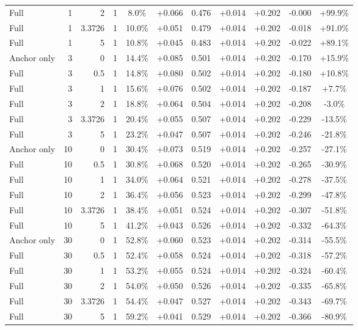 \begin{table}[htbp]
\begin{tabular}{lrrrccccccc}
Full & 1 & 2 & 1 & 8.0\% & +0.066 & 0.476 & +0.014 & +0.202 & -0.000 & +99.9\% \\
Full & 1 & 3.3726 & 1 & 10.0\% & +0.051 & 0.479 & +0.014 & +0.202 & -0.018 & +91.0\% \\
Full & 1 & 5 & 1 & 10.8\% & +0.045 & 0.483 & +0.014 & +0.202 & -0.022 & +89.1\% \\
Anchor only & 3 & 0 & 1 & 14.4\% & +0.085 & 0.501 & +0.014 & +0.202 & -0.170 & +15.9\% \\
Full & 3 & 0.5 & 1 & 14.8\% & +0.080 & 0.502 & +0.014 & +0.202 & -0.180 & +10.8\% \\
Full & 3 & 1 & 1 & 15.6\% & +0.076 & 0.502 & +0.014 & +0.202 & -0.187 & +7.7\% \\
Full & 3 & 2 & 1 & 18.8\% & +0.064 & 0.504 & +0.014 & +0.202 & -0.208 & -3.0\% \\
Full & 3 & 3.3726 & 1 & 20.4\% & +0.055 & 0.507 & +0.014 & +0.202 & -0.229 & -13.5\% \\
Full & 3 & 5 & 1 & 23.2\% & +0.047 & 0.507 & +0.014 & +0.202 & -0.246 & -21.8\% \\
Anchor only & 10 & 0 & 1 & 30.4\% & +0.073 & 0.519 & +0.014 & +0.202 & -0.257 & -27.1\% \\
Full & 10 & 0.5 & 1 & 30.8\% & +0.068 & 0.520 & +0.014 & +0.202 & -0.265 & -30.9\% \\
Full & 10 & 1 & 1 & 34.0\% & +0.064 & 0.521 & +0.014 & +0.202 & -0.278 & -37.5\% \\
Full & 10 & 2 & 1 & 36.4\% & +0.056 & 0.523 & +0.014 & +0.202 & -0.299 & -47.8\% \\
Full & 10 & 3.3726 & 1 & 38.4\% & +0.051 & 0.524 & +0.014 & +0.202 & -0.307 & -51.8\% \\
Full & 10 & 5 & 1 & 41.2\% & +0.043 & 0.526 & +0.014 & +0.202 & -0.332 & -64.3\% \\
Anchor only & 30 & 0 & 1 & 52.8\% & +0.060 & 0.523 & +0.014 & +0.202 & -0.314 & -55.5\% \\
Full & 30 & 0.5 & 1 & 52.4\% & +0.058 & 0.524 & +0.014 & +0.202 & -0.318 & -57.2\% \\
Full & 30 & 1 & 1 & 53.2\% & +0.055 & 0.524 & +0.014 & +0.202 & -0.324 & -60.4\% \\
Full & 30 & 2 & 1 & 54.0\% & +0.050 & 0.526 & +0.014 & +0.202 & -0.335 & -65.8\% \\
Full & 30 & 3.3726 & 1 & 54.4\% & +0.047 & 0.527 & +0.014 & +0.202 & -0.343 & -69.7\% \\
Full & 30 & 5 & 1 & 59.2\% & +0.041 & 0.529 & +0.014 & +0.202 & -0.366 & -80.9\% \\

\end{tabular}
\end{table}
